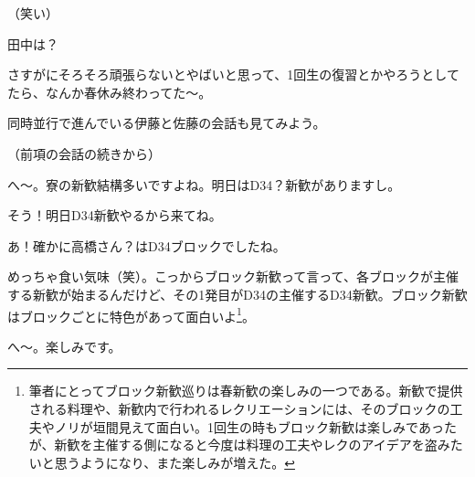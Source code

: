 \begin{multicols}{2}
（笑い）

田中は？

さすがにそろそろ頑張らないとやばいと思って、1回生の復習とかやろうとしてたら、なんか春休み終わってた～。

同時並行で進んでいる伊藤と佐藤の会話も見てみよう。
\par
（前項の会話の続きから）
\par
{}
へ～。寮の新歓結構多いですよね。明日はD34？新歓がありますし。

そう！明日D34新歓やるから来てね。

あ！確かに高橋さん？はD34ブロックでしたね。

めっちゃ食い気味（笑）。こっからブロック新歓って言って、各ブロックが主催する新歓が始まるんだけど、その1発目がD34の主催するD34新歓。ブロック新歓はブロックごとに特色があって面白いよ\footnote{筆者にとってブロック新歓巡りは春新歓の楽しみの一つである。新歓で提供される料理や、新歓内で行われるレクリエーションには、そのブロックの工夫やノリが垣間見えて面白い。1回生の時もブロック新歓は楽しみであったが、新歓を主催する側になると今度は料理の工夫やレクのアイデアを盗みたいと思うようになり、また楽しみが増えた。}。

へ～。楽しみです。
\par
\dotfill


\end{multicols}
